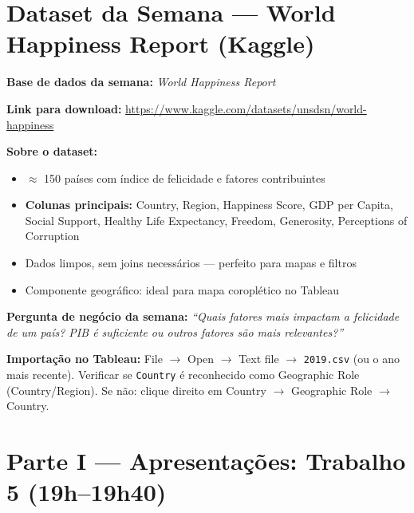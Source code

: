 \section{Dataset da Semana — World Happiness Report (Kaggle)}

\begin{BoardBox}
\textbf{Base de dados da semana:} \textit{World Happiness Report}

\textbf{Link para download:}
\url{https://www.kaggle.com/datasets/unsdsn/world-happiness}

\textbf{Sobre o dataset:}
\begin{itemize}
  \item $\approx$ 150 países com índice de felicidade e fatores contribuintes
  \item \textbf{Colunas principais:} Country, Region, Happiness Score,
  GDP per Capita, Social Support, Healthy Life Expectancy, Freedom,
  Generosity, Perceptions of Corruption
  \item Dados limpos, sem joins necessários — perfeito para mapas e filtros
  \item Componente geográfico: ideal para mapa coroplético no Tableau
\end{itemize}

\textbf{Pergunta de negócio da semana:}
\textit{``Quais fatores mais impactam a felicidade de um país?
 PIB é suficiente ou outros fatores são mais relevantes?''}
\end{BoardBox}

\begin{NoteBox}
\textbf{Importação no Tableau:} File $\to$ Open $\to$ Text file $\to$
\texttt{2019.csv} (ou o ano mais recente). Verificar se \texttt{Country}
é reconhecido como Geographic Role (Country/Region). Se não:
clique direito em Country $\to$ Geographic Role $\to$ Country.
\end{NoteBox}

\section{Parte I — Apresentações: Trabalho 5 (19h–19h40)}

